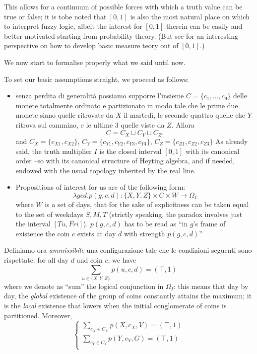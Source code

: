 \begin{example}
  This allows for a continuum of possible forces with which a truth value can be true or false;  it is tobe noted that $[0,1]$ is also the most natural place on which to interpret fuzzy logic, albeit the interest for $[0,1]$ therein can be easily and better motivated starting from probability theory. (But see \cite{} for an interesting perspective on how to develop basic measure teory out of $[0,1]$.)

  We now start to formalise properly what we said until now.

  To set our basic assumptions straight, we proceed as follows:
  \begin{itemize}
    \item senza perdita di generalità possiamo supporre l'insieme $C = \{c_1,\dots,c_9\}$ delle monete totalmente ordinato e partizionato in modo tale che le prime due monete siano quelle ritrovate da $X$ il martedì, le seconde quattro quelle che $Y$ ritrova sul cammino, e le ultime 3 quelle viste da $Z$. Allora
    \[C = C_X \sqcup C_Y \sqcup C_Z.\]
    and $C_X = \{c_{X1}, c_{X2}\}$, $C_Y = \{
    c_{Y1},c_{Y2},c_{Y3},c_{Y4}\}$, $C_Z= \{c_{Z1}, c_{Z2}, c_{Z3}\}$ As already said, the truth multiplier $I$ is the closed interval $[0,1]$ with its canonical order --so with its canonical structure of Heyting algebra, and if needed, endowed with the usual topology inherited by the real line.
    \item Propositions of interest for us are of the following form:
    \[\lambda gcd.p(g, c, d) : \{X,Y,Z\}\times C\times W \to \Omega_I\]
    where $W$ is a set of days, that for the sake of explicitness can be taken equal to the set of weekdays $S,M,T$ (strictly speaking, the paradox involves just the interval $[Tu,Fri]$). $p(g,c,d)$ has to be read as ``in $g$'s frame of existence the coin $c$ exists at day $d$ with strength $p(g,c,d)$''
  \end{itemize}
  Definiamo ora \emph{ammissibile} una configurazione tale che le condizioni seguenti sono rispettate: for all day $d$ and coin $c$, we have
  \[
    \sum_{u\in \{X,Y,Z\}} p(u,c,d) = (\top, 1) 
  \]
  where we denote as ``sum'' the logical conjunction in $\Omega_I$: this means that day by day, the \emph{global} existence of the group of coins constantly attains the maximum; it is the \emph{local} existence that lowers when the initial conglomerate of coins is partitioned. Moreover,
  \[
  \begin{cases}
    \sum_{c_X\in C_X} p(X,c_X,V) = (\top,1)\\
    \sum_{c_Y\in C_Y} p(Y,c_Y,G) = (\top,1)\\

\end{cases}\]
\end{example}
